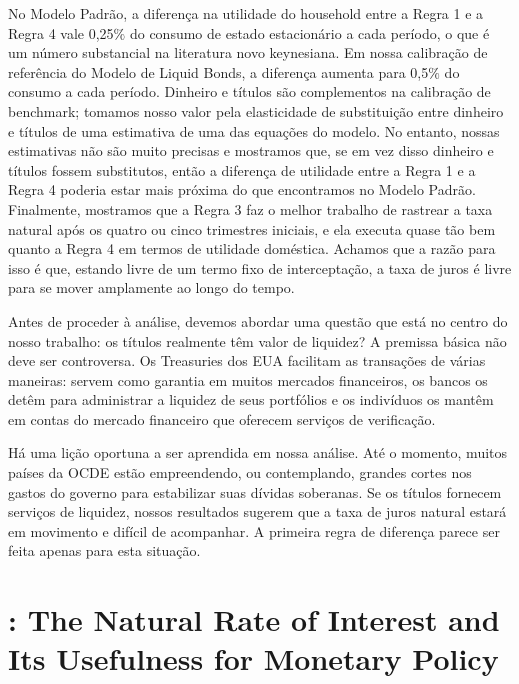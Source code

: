 \documentclass[11pt,oneside,a4paper]{article}
\begin{document}
No Modelo Padrão, a diferença na utilidade do household entre a Regra 1 e a Regra 4 vale 0,25$\%$ do consumo de estado estacionário a cada período, o que é um número substancial na literatura novo keynesiana. Em nossa calibração de referência do Modelo de Liquid Bonds, a diferença aumenta para 0,5$\%$ do consumo a cada período. Dinheiro e títulos são complementos na calibração de benchmark; tomamos nosso valor pela elasticidade de substituição entre dinheiro e títulos de uma estimativa de uma das equações do modelo. No entanto, nossas estimativas não são muito precisas e mostramos que, se em vez disso dinheiro e títulos fossem substitutos, então a diferença de utilidade entre a Regra 1 e a Regra 4 poderia estar mais próxima do que encontramos no Modelo Padrão. Finalmente, mostramos que a Regra 3 faz o melhor trabalho de rastrear a taxa natural após os quatro ou cinco trimestres iniciais, e ela executa quase tão bem quanto a Regra 4 em termos de utilidade doméstica. Achamos que a razão para isso é que, estando livre de um termo fixo de interceptação, a taxa de juros é livre para se mover amplamente ao longo do tempo.

Antes de proceder à análise, devemos abordar uma questão que está no centro do nosso trabalho: os títulos realmente têm valor de liquidez? A premissa básica não deve ser controversa. Os Treasuries dos EUA facilitam as transações de várias maneiras: servem como garantia em muitos mercados financeiros, os bancos os detêm para administrar a liquidez de seus portfólios e os indivíduos os mantêm em contas do mercado financeiro que oferecem serviços de verificação.

Há uma lição oportuna a ser aprendida em nossa análise. Até o momento, muitos países da OCDE estão empreendendo, ou contemplando, grandes cortes nos gastos do governo para estabilizar suas dívidas soberanas. Se os títulos fornecem serviços de liquidez, nossos resultados sugerem que a taxa de juros natural estará em movimento e difícil de acompanhar. A primeira regra de diferença parece ser feita apenas para esta situação.
%
%
\section{\citet{Melosi:2015}: The Natural Rate of Interest and Its Usefulness for Monetary Policy }
\end{document}
